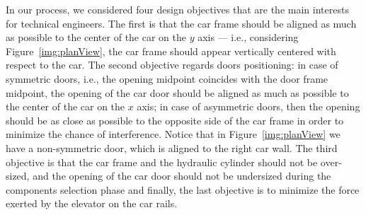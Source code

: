 In our process, we considered four design objectives that are the main
interests for technical engineers. The first is that the car frame 
should be aligned as much as possible to the center of the car on the 
$y$ axis --- i.e., considering Figure~\ref{img:planView}, the car frame
should appear vertically centered with respect to the car. The second 
objective regards doors positioning: in case of symmetric doors, i.e., 
the opening midpoint coincides with the door frame midpoint, the opening
of the car door should be aligned as much as possible to the center 
of the car on the $x$ axis; in case of asymmetric doors, then the 
opening should be as close as possible to the opposite side of the car
frame in order to minimize the chance of interference. 
Notice that in Figure~\ref{img:planView} we have a non-symmetric door, 
which is aligned to the right car wall. The third objective is that 
the car frame and the hydraulic cylinder should not be over-sized, 
and the opening of the car door should not be undersized during the 
components selection phase and finally, the last objective is to 
minimize the force exerted by the elevator on the car rails.

